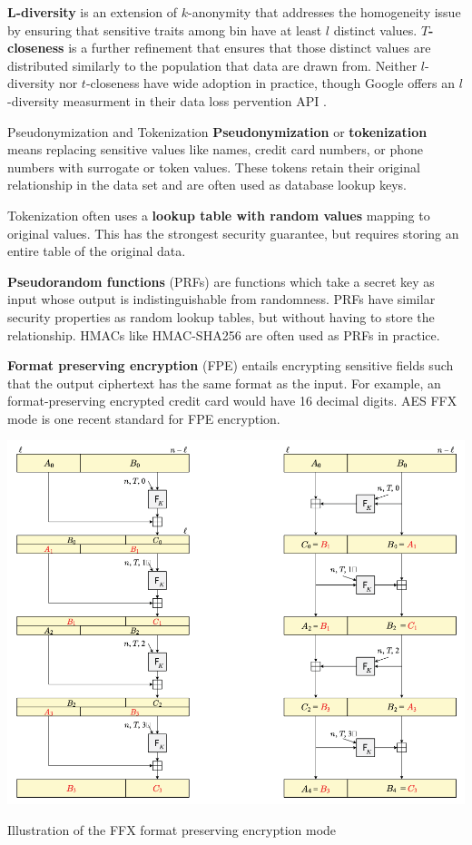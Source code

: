 \documentclass[nobib]{tufte-handout}
\begin{document}
\textbf{L-diversity} \cite{DBLP:conf/icde/MachanavajjhalaGKV06} is an extension
of $k$-anonymity that addresses the homogeneity issue by ensuring that sensitive
traits among bin have at least $l$ distinct values. \textbf{$T$-closeness}
\cite{DBLP:conf/icde/LiLV07} is a further refinement that ensures that those
distinct values are distributed similarly to the population that data are drawn
from. Neither $l$-diversity nor $t$-closeness have wide adoption in practice,
though Google offers an $l$-diversity measurment in their data loss pervention
API \cite{google-risk-analysis}.

Pseudonymization and Tokenization \textbf{Pseudonymization} or
\textbf{tokenization} means replacing sensitive values like names, credit card
numbers, or phone numbers with surrogate or token values. These tokens retain
their original relationship in the data set and are often used as database
lookup keys.

Tokenization often uses a \textbf{lookup table with random values} mapping to
original values. This has the strongest security guarantee, but requires storing
an entire table of the original data.

\textbf{Pseudorandom functions} (PRFs) are functions which take a secret key as
input whose output is indistinguishable from randomness. PRFs have similar
security properties as random lookup tables, but without having to store the
relationship. HMACs like HMAC-SHA256 are often used as PRFs in practice.

\textbf{Format preserving encryption} \cite{DBLP:conf/sacrypt/BellareRRS09}
(FPE) entails encrypting sensitive fields such that the output ciphertext has
the same format as the input. For example, an format-preserving encrypted credit
card would have 16 decimal digits. AES FFX mode \cite{dworkin2016recommendation}
is one recent standard for FPE encryption.

\begin{marginfigure}
\includegraphics[width=\linewidth]{ffx}
\caption{Illustration of the FFX format preserving encryption mode} \label{fig:ffx}
\end{marginfigure}
\end{document}
